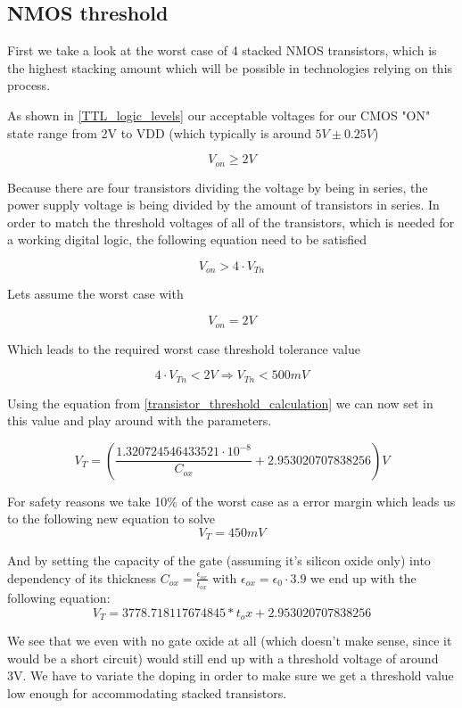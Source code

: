 \subsection{NMOS threshold}
First we take a look at the worst case of 4 stacked NMOS transistors, which is the highest stacking amount which will be possible in technologies relying on this process.

As shown in  \autoref{TTL_logic_levels} our acceptable voltages for our CMOS "ON" state range from 2V to VDD (which typically is around $5V\pm0.25V$)

\begin{equation}
V_{on} \geq 2V
\end{equation}

Because there are four transistors dividing the voltage by being in series, the power supply voltage is being divided by the amount of transistors in series.
In order to match the threshold voltages of all of the transistors, which is needed for a working digital logic, the following equation need to be satisfied

\begin{equation}
V_{on} > 4 \cdot V_{Tn}
\end{equation}

Lets assume the worst case with

\begin{equation}
V_{on} = 2V
\end{equation}

Which leads to the required worst case threshold tolerance value

\begin{equation}
4 \cdot V_{Tn} < 2V
\Rightarrow
V_{Tn} < 500mV
\end{equation}
 
 Using the equation from \autoref{transistor_threshold_calculation} we can now set in this value and play around with the parameters.
 
 \begin{equation}
V_T = \left( \frac{1.320724546433521 \cdot 10^{-8}}{C_{ox}}+2.953020707838256 \right)  V
\end{equation}

For safety reasons we take 10\% of the worst case as a error margin which leads us to the following new equation to solve
 \begin{equation}
V_T = 450mV
\end{equation}

And by setting the capacity of the gate (assuming it's silicon oxide only) into dependency of its thickness $C_{ox}=\frac{\epsilon_{ox}}{t_{ox}}$ with $\epsilon_{ox} = \epsilon_{0} \cdot 3.9$ we end up with the following equation:
\begin{equation}
V_T=3778.718117674845*t_ox+2.953020707838256
\end{equation}

We see that we even with no gate oxide at all (which doesn't make sense, since it would be a short circuit) would still end up with a threshold voltage of around 3V.
We have to variate the doping in order to make sure we get a threshold value low enough for accommodating  stacked transistors.


